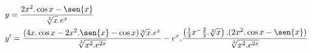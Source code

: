 \begin{ex}
\begin{align}
&y=\frac{2x^2.\cos{x}-\sen{x}}{\sqrt[3]{x}.e^x}\nonumber\\
&y'=\frac{(4x.\cos{x}-2x^2.\sen{x}-\cos{x})\sqrt[3]{x}.e^x}{\sqrt[3]{x^2.e^{2x}}}-e^x.\frac{\left(\frac{1}{3}x^-\frac{2}{3}.\sqrt[3]{x}\right).(2x^2.\cos{x}-\sen{x})}{\sqrt[3]{x^2.e^{2x}}}\nonumber
\end{align}
\end{ex}